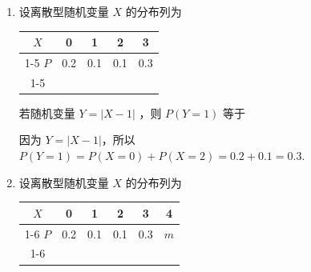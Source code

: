 \begin{enumerate}
\begin{enumerate}
\begin{center}
        \end{center}
        \begin{jieda}
            由离散型随机变量的性质可得 $\dfrac{1}{3} + 1 - {2q} + 3{q}^{2} - q + \dfrac{1}{3} = 1$，即 $\left( {{3q} - 1}\right) \left( {{3q} - 2}\right)  = 0$ ，解得 $q = \dfrac{1}{3}$ 或 $q = \dfrac{2}{3}$
            
            $q = \dfrac{2}{3}$ 时 $1 - {2q} < 0$ ，不合题意， $\therefore q = \dfrac{1}{3}$
            
            $\therefore P\left( |X| = 1\right)  = P\left( {X =  - 1}\right)  + P\left( {X = 1}\right)  = 1 - P\left( {X = 0}\right)  = \dfrac{2}{3}$
        \end{jieda}

        
        \item 设离散型随机变量 $X$ 的分布列为
        
        \begin{center}
        
        \begin{tabular}{|c|c|c|c|c|}
        \hline
        $X$ & 0 & 1 & 2 & 3 \\
        \cline{1-5}
        $P$ & 0.2 & 0.1 & 0.1 & 0.3 \\
        \cline{1-5}
        \hline
        \end{tabular}
        
        \end{center}
        
        若随机变量 $Y = \left| {X - 1}\right|$ ，则 $P\left( {Y = 1}\right)$ 等于
        \begin{jieda}
            因为 $Y = \left| {X - 1}\right|$，所以 $P\left( {Y = 1}\right)  = P\left( {X = 0}\right)  + P\left( {X = 2}\right)  = {0.2} + {0.1} = {0.3}$.
        \end{jieda}
        
        \item 设离散型随机变量 $X$ 的分布列为

        \begin{center}
        
        \begin{tabular}{|c|c|c|c|c|c|}
        \hline
        $X$ & 0 & 1 & 2 & 3 & 4 \\
        \cline{1-6}
        $P$ & 0.2 & 0.1 & 0.1 & 0.3 & $m$ \\
        \cline{1-6}
        \hline
        \end{tabular}
        

\end{center}
\end{enumerate}
\end{enumerate}

